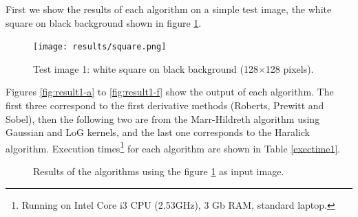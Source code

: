\documentclass{ipol}
\numberwithin{equation}{section}
\numberwithin{table}{section}
\numberwithin{figure}{section}
\begin{document}
First we show the results of each algorithm on a simple test image, the white square on black background shown in figure \ref{fig:original1}. \\

\begin{figure}[h!]
	\centering
	\texttt{[image: results/square.png]}
	\caption{Test image 1: white square on black background (128$\times$128 pixels).}
	\label{fig:original1}
\end{figure}

Figures \ref{fig:result1-a} to \ref{fig:result1-f} show the output of each algorithm. The first three correspond to the first derivative methods (Roberts, Prewitt and Sobel), then the following two are from the Marr-Hildreth algorithm using Gaussian and LoG kernels, and the last one corresponds to the Haralick algorithm. Execution times\footnote{Running on Intel Core i3 CPU (2.53GHz), 3 Gb RAM, standard laptop.} for each algorithm are shown in Table \ref{exectime1}. \\

\begin{figure}[h!]
	\centering
	\quad
	\quad

	\quad
	\quad
	\caption{Results of the algorithms using the figure \ref{fig:original1} as input image.}
	\label{fig:result1}
\end{figure}
\end{document}
